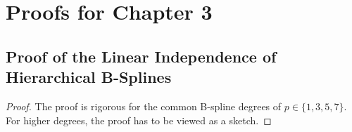 \section{Proofs for Chapter 3}
\label{sec:a12chapter3}

\disableornamentsfornextheadingtrue
\subsection{Proof of the Linear Independence of Hierarchical B-Splines}
\label{sec:a121proofHierBSplineLinearlyIndependent}

\propHierBSplineLinearlyIndependent*

\begin{proof}
  The proof is rigorous for the common B-spline degrees of
  $p \in \{1, 3, 5, 7\}$.
  For higher degrees, the proof has to be viewed as a sketch.
  

\end{proof}
